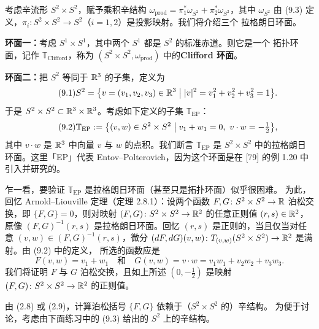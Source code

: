 考虑辛流形 $S^2\times S^2$，赋予乘积辛结构
$\omega_{\mathrm{prod}}=\pi_1^*\omega_{S^2}+\pi_2^*\omega_{S^2}$，其中 $\omega_{S^2}$ 由
(9.3) 定义，$\pi_i\colon S^2\times S^2\to S^2$（$i=1,2$）是投影映射。我们将介绍三个
拉格朗日环面。

\textbf{环面一：}考虑 $S^1\times S^1$，其中两个 $S^1$ 都是 $S^2$ 的标准赤道。则它是一个
拓扑环面，记作 $\mathbb{T}_{\mathrm{Clifford}}$，称为 $(S^2\times S^2,\omega_{\mathrm{prod}})$
中的\textbf{Clifford 环面}。

\textbf{环面二：}把 $S^2$ 等同于 $\mathbb{R}^3$ 的子集，定义为
\begin{equation}\tag{9.1}
  S^2=\bigl\{v=(v_1,v_2,v_3)\in\mathbb{R}^3\bigm| |v|^2=v_1^2+v_2^2+v_3^2=1\bigr\}.
\end{equation}
于是 $S^2\times S^2\subset\mathbb{R}^3\times\mathbb{R}^3$。考虑如下定义的子集
$\mathbb{T}_{\mathrm{EP}}$：
\begin{equation}\tag{9.2}
  \mathbb{T}_{\mathrm{EP}}:=\bigl\{(v,w)\in S^2\times S^2\bigm|
  v_1+w_1=0,\ v\cdot w=-\tfrac12\bigr\},
\end{equation}
其中 $v\cdot w$ 是 $\mathbb{R}^3$ 中向量 $v$ 与 $w$ 的点积。我们断言
$\mathbb{T}_{\mathrm{EP}}$ 是 $S^2\times S^2$ 中的拉格朗日环面。这里「EP」代表
Entov--Polterovich，因为这个环面是在 [79] 的例 1.20 中引入并研究的。

乍一看，要验证 $\mathbb{T}_{\mathrm{EP}}$ 是拉格朗日环面（甚至只是拓扑环面）似乎很困难。
为此，回忆 Arnold--Liouville 定理（定理 2.8.1）：设两个函数
$F,G\colon S^2\times S^2\to\mathbb{R}$ 泊松交换，即 $\{F,G\}=0$，则对映射
$(F,G)\colon S^2\times S^2\to\mathbb{R}^2$ 的任意正则值 $(r,s)\in\mathbb{R}^2$，原像
$(F,G)^{-1}(r,s)$ 是拉格朗日环面。回忆 $(r,s)$ 是正则的，当且仅当对任意
$(v,w)\in(F,G)^{-1}(r,s)$，微分
$(dF,dG)(v,w)\colon T_{(v,w)}(S^2\times S^2)\to\mathbb{R}^2$ 是满射。由 (9.2) 中的定义，
所选的函数应是
\begin{equation*}
  F(v,w)=v_1+w_1\quad\text{和}\quad
  G(v,w)=v\cdot w=v_1w_1+v_2w_2+v_3w_3.
\end{equation*}
我们将证明 $F$ 与 $G$ 泊松交换，且如上所述 $(0,-\tfrac12)$ 是映射
$(F,G)\colon S^2\times S^2\to\mathbb{R}^2$ 的正则值。

由 (2.8) 或 (2.9)，计算泊松括号 $\{F,G\}$ 依赖于（$S^2\times S^2$ 的）辛结构。
为便于讨论，考虑由下面练习中的 (9.3) 给出的 $S^2$ 上的辛结构。

